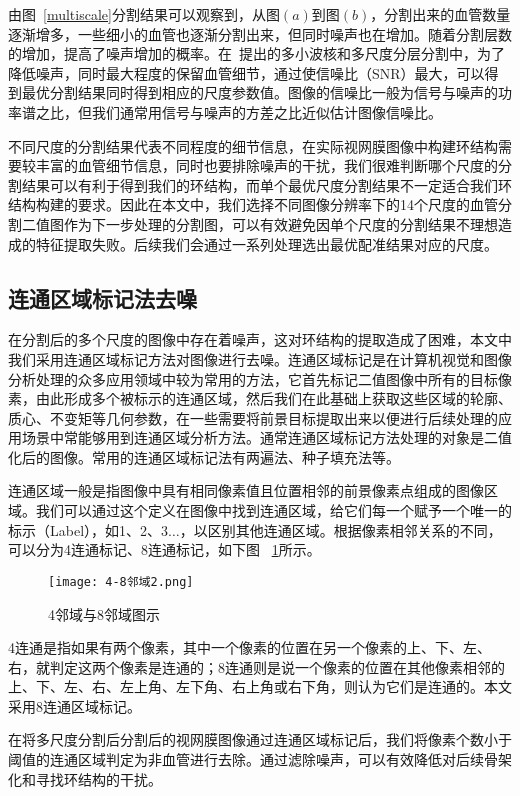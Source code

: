 由图~\ref{multiscale}分割结果可以观察到，从图$(a)$到图$(b)$，分割出来的血管数量逐渐增多，一些细小的血管也逐渐分割出来，但同时噪声也在增加。随着分割层数的增加，提高了噪声增加的概率。在~\cite{wang}提出的多小波核和多尺度分层分割中，为了降低噪声，同时最大程度的保留血管细节，通过使信噪比（SNR）最大，可以得到最优分割结果同时得到相应的尺度参数值。图像的信噪比一般为信号与噪声的功率谱之比，但我们通常用信号与噪声的方差之比近似估计图像信噪比。 

不同尺度的分割结果代表不同程度的细节信息，在实际视网膜图像中构建环结构需要较丰富的血管细节信息，同时也要排除噪声的干扰，我们很难判断哪个尺度的分割结果可以有利于得到我们的环结构，而单个最优尺度分割结果不一定适合我们环结构构建的要求。因此在本文中，我们选择不同图像分辨率下的14个尺度的血管分割二值图作为下一步处理的分割图，可以有效避免因单个尺度的分割结果不理想造成的特征提取失败。后续我们会通过一系列处理选出最优配准结果对应的尺度。

\subsection{连通区域标记法去噪}
在分割后的多个尺度的图像中存在着噪声，这对环结构的提取造成了困难，本文中我们采用连通区域标记方法对图像进行去噪。连通区域标记是在计算机视觉和图像分析处理的众多应用领域中较为常用的方法，它首先标记二值图像中所有的目标像素，由此形成多个被标示的连通区域，然后我们在此基础上获取这些区域的轮廓、质心、不变矩等几何参数，在一些需要将前景目标提取出来以便进行后续处理的应用场景中常能够用到连通区域分析方法。通常连通区域标记方法处理的对象是二值化后的图像。常用的连通区域标记法有两遍法、种子填充法等。

连通区域一般是指图像中具有相同像素值且位置相邻的前景像素点组成的图像区域。我们可以通过这个定义在图像中找到连通区域，给它们每一个赋予一个唯一的标示（Label），如1、2、3$\ldots$，以区别其他连通区域。根据像素相邻关系的不同，可以分为4连通标记、8连通标记，如下图 ~\ref{liantong}所示。
   \begin{figure}[ht!]
   \centering
  \texttt{[image: 4-8邻域2.png]}
  \caption{4邻域与8邻域图示}
   \label{liantong}
 \end{figure}
 
4连通是指如果有两个像素，其中一个像素的位置在另一个像素的上、下、左、右，就判定这两个像素是连通的；8连通则是说一个像素的位置在其他像素相邻的上、下、左、右、左上角、左下角、右上角或右下角，则认为它们是连通的。本文采用8连通区域标记。

在将多尺度分割后分割后的视网膜图像通过连通区域标记后，我们将像素个数小于阈值的连通区域判定为非血管进行去除。通过滤除噪声，可以有效降低对后续骨架化和寻找环结构的干扰。

